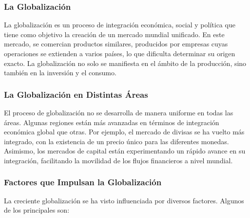 \documentclass[
  a4paper,
]{article}
\begin{document}
\hypertarget{la-globalizaciuxf3n}{%
\subsubsection{La Globalización}\label{la-globalizaciuxf3n}}

La globalización es un proceso de integración económica, social y
política que tiene como objetivo la creación de un mercado mundial
unificado. En este mercado, se comercian productos similares, producidos
por empresas cuyas operaciones se extienden a varios países, lo que
dificulta determinar su origen exacto. La globalización no solo se
manifiesta en el ámbito de la producción, sino también en la inversión y
el consumo.

\hypertarget{la-globalizaciuxf3n-en-distintas-uxe1reas}{%
\subsubsection{La Globalización en Distintas
Áreas}\label{la-globalizaciuxf3n-en-distintas-uxe1reas}}

El proceso de globalización no se desarrolla de manera uniforme en todas
las áreas. Algunas regiones están más avanzadas en términos de
integración económica global que otras. Por ejemplo, el mercado de
divisas se ha vuelto más integrado, con la existencia de un precio único
para las diferentes monedas. Asimismo, los mercados de capital están
experimentando un rápido avance en su integración, facilitando la
movilidad de los flujos financieros a nivel mundial.

\hypertarget{factores-que-impulsan-la-globalizaciuxf3n}{%
\subsubsection{Factores que Impulsan la
Globalización}\label{factores-que-impulsan-la-globalizaciuxf3n}}

La creciente globalización se ha visto influenciada por diversos
factores. Algunos de los principales son:
\end{document}
